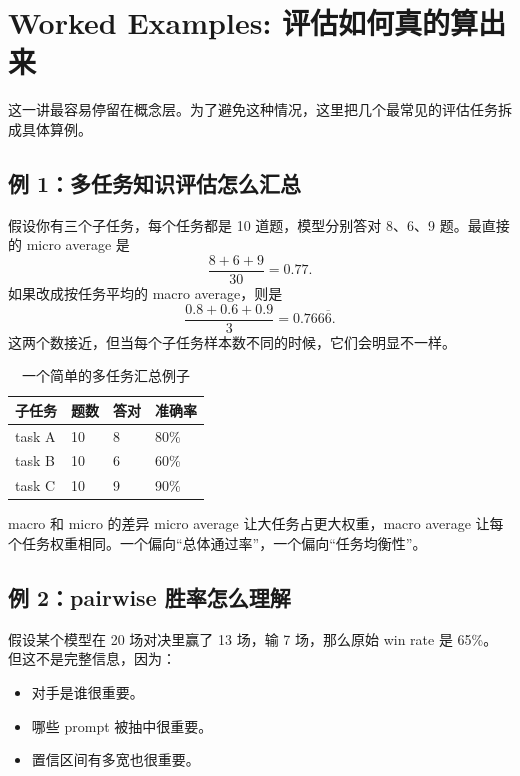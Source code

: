 \section{Worked Examples: 评估如何真的算出来}

这一讲最容易停留在概念层。为了避免这种情况，这里把几个最常见的评估任务拆成具体算例。

\subsection{例 1：多任务知识评估怎么汇总}

假设你有三个子任务，每个任务都是 10 道题，模型分别答对 8、6、9 题。最直接的 micro average 是
\[
\frac{8+6+9}{30} = 0.77.
\]
如果改成按任务平均的 macro average，则是
\[
\frac{0.8+0.6+0.9}{3} = 0.766\overline{6}.
\]
这两个数接近，但当每个子任务样本数不同的时候，它们会明显不一样。

\begin{table}[H]
\centering
\begin{tabular}{p{2.8cm}p{2.6cm}p{2.6cm}p{2.6cm}}
\toprule
\textbf{子任务} & \textbf{题数} & \textbf{答对} & \textbf{准确率} \\
\midrule
task A & 10 & 8 & 80\% \\
task B & 10 & 6 & 60\% \\
task C & 10 & 9 & 90\% \\
\bottomrule
\end{tabular}
\caption{一个简单的多任务汇总例子}
\end{table}

\begin{knowledgebox}{macro 和 micro 的差异}
micro average 让大任务占更大权重，macro average 让每个任务权重相同。一个偏向“总体通过率”，一个偏向“任务均衡性”。
\end{knowledgebox}

\subsection{例 2：pairwise 胜率怎么理解}

假设某个模型在 20 场对决里赢了 13 场，输 7 场，那么原始 win rate 是 65\%。
但这不是完整信息，因为：
\begin{itemize}
    \item 对手是谁很重要。
    \item 哪些 prompt 被抽中很重要。
    \item 置信区间有多宽也很重要。
\end{itemize}


